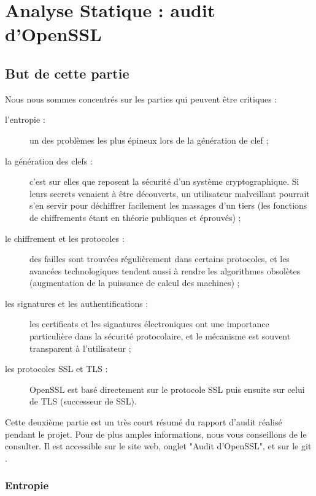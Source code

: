 \chapter{Analyse Statique : audit d'OpenSSL}

\section{But de cette partie}
Nous nous sommes concentrés sur les parties qui peuvent être critiques : 
\begin{description}
	\item [l'entropie :] un des problèmes les plus épineux lors de la génération de clef ;
	\item [la génération des clefs : ] c'est sur elles que reposent la sécurité d'un système cryptographique. Si leurs secrets venaient à être découverts, un utilisateur malveillant pourrait s'en servir pour déchiffrer facilement les massages d'un tiers (les fonctions de chiffrements étant en théorie publiques et éprouvés) ;
	\item [le chiffrement et les protocoles :] des failles sont trouvées régulièrement dans certains protocoles, et les avancées technologiques tendent aussi à rendre les algorithmes obsolètes (augmentation de la puissance de calcul des machines) ;
	\item [les signatures et les authentifications : ] les certificats et les signatures électroniques ont une importance particulière dans la sécurité protocolaire, et le mécanisme est souvent transparent à l'utilisateur ;
	\item [les protocoles SSL et TLS : ] OpenSSL est basé directement sur le protocole SSL puis ensuite sur celui de TLS (successeur de SSL).\\
\end{description}
Cette deuxième partie est un très court résumé du rapport d'audit réalisé pendant le projet. Pour de plus amples informations, nous vous conseillons de le consulter. Il est accessible sur le site web, onglet "Audit d'OpenSSL", et sur le git \cite{notregit}.

\subsection{Entropie}

